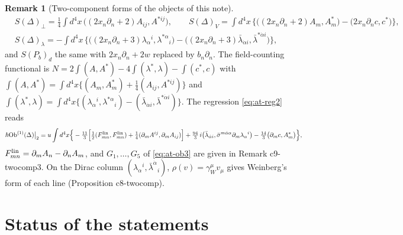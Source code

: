 \documentclass[11pt]{article}
\numberwithin{equation}{section}
\theoremstyle{plain}
\theoremstyle{definition}
\newtheorem{remark}[theorem]{Remark}
\newcommand{\Ob}{\mathrm{Ob}}
\begin{document}
\begin{remark}[Two-component forms of the objects of this note]
\[
\begin{aligned}
&S(\Delta)_\perp=\tfrac14\int d^4x\,\big((2x_n\partial_n+2)A_{ij},A^{*ij}\big),\qquad S(\Delta)_V=\int d^4x\,\Big\{\big((2x_n\partial_n+2)A_m,A^*_m\big)-\big(2x_n\partial_nc,c^*\big)\Big\},\\
&S(\Delta)_\lambda=-\int d^4x\,\Big\{\big((2x_n\partial_n+3)\lambda_\alpha{}^i,\lambda^{*\alpha}{}_i\big)-\big((2x_n\partial_n+3)\bar\lambda_{\dot\alpha i},\bar\lambda^{*\dot\alpha i}\big)\Big\},
\end{aligned}
\]
and $S(P_b)_d$ the same with $2x_n\partial_n+2w$ replaced by $b_n\partial_n$. The field-counting functional is $N=2\int(A,A^*)-4\int(\lambda^*,\lambda)-\int(c^*,c)$ with $\int(A,A^*)=\int d^4x\{(A_m,A^*_m)+\tfrac14(A_{ij},A^{*ij})\}$ and $\int(\lambda^*,\lambda)=\int d^4x\{(\lambda_\alpha{}^i,\lambda^{*\alpha}{}_i)-(\bar\lambda_{\dot\alpha i},\bar\lambda^{*\dot\alpha i})\}$. The regression \eqref{eq:at-reg2} reads
\[
\hbar\Ob^{(1)}(\Delta)\big|_2=u\int d^4x\Big\{-\tfrac{11}3\Big[\tfrac12(F^{\rm lin}_{mn},F^{\rm lin}_{mn})+\tfrac14(\partial_mA^{ij},\partial_mA_{ij})\Big]+\tfrac{94}3\,i\big(\bar\lambda_{\dot\alpha i},\bar\sigma^{m\dot\alpha\alpha}\partial_m\lambda_\alpha{}^i\big)-\tfrac{14}3\big(\partial_mc,A^*_m\big)\Big\},
\]
$F^{\rm lin}_{mn}=\partial_mA_n-\partial_nA_m$, and $G_1,\dots,G_5$ of \eqref{eq:at-ob3} are given in Remark c9-twocomp3. On the Dirac column $(\lambda_\alpha{}^i,\bar\lambda^{\dot\alpha}{}_i)$, $\rho(v)=\gamma_W^\mu v_\mu$ gives Weinberg's form of each line (Proposition c8-twocomp).
\end{remark}

\section{Status of the statements}
\label{sec:at-status}
\end{document}
